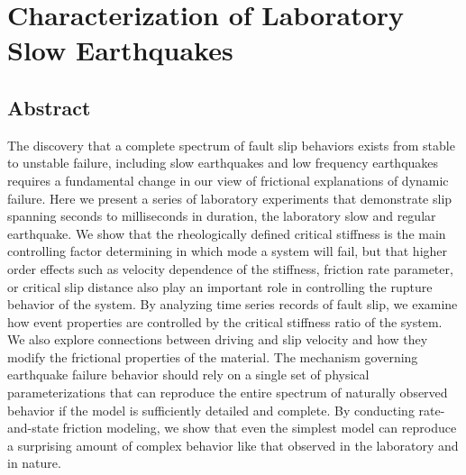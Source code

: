 \chapter{Characterization of Laboratory Slow Earthquakes}

\section{Abstract}
The discovery that a complete spectrum of fault slip behaviors exists from stable to unstable failure, including slow earthquakes and low frequency earthquakes requires a fundamental change in our view of frictional explanations of dynamic failure. Here we present a series of laboratory experiments that demonstrate slip spanning seconds to milliseconds in duration, the laboratory slow and regular earthquake. We show that the rheologically defined critical stiffness is the main controlling factor determining in which mode a system will fail, but that higher order effects such as velocity dependence of the stiffness, friction rate parameter, or critical slip distance also play an important role in controlling the rupture behavior of the system. By analyzing time series records of fault slip, we examine how event properties are controlled by the critical stiffness ratio of the system. We also explore connections between driving and slip velocity and how they modify the frictional properties of the material. The mechanism governing earthquake failure behavior should rely on a single set of physical parameterizations that can reproduce the entire spectrum of naturally observed behavior if the model is sufficiently detailed and complete.  By conducting rate-and-state friction modeling, we show that even the simplest model can reproduce a surprising amount of complex behavior like that observed in the laboratory and in nature.

